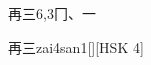 \begin{entry}{再三}{6,3}{⼌、⼀}
  \begin{phonetics}{再三}{zai4san1}[][HSK 4]
  \end{phonetics}
\end{entry}
